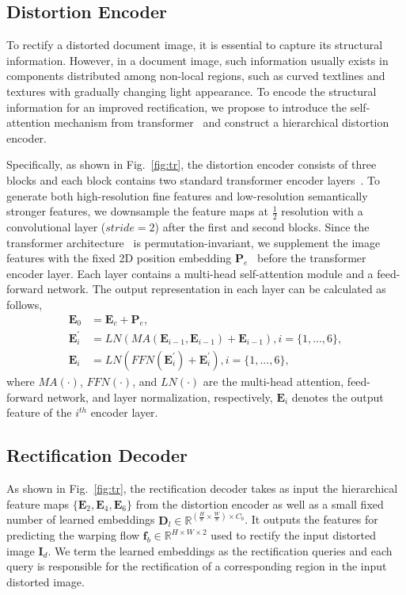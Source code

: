 \documentclass[lettersize,journal]{IEEEtran}
\begin{document}
\subsection{Distortion Encoder}
To rectify a distorted document image, it is essential to capture its structural information.
However, in a document image, such information usually exists in components distributed among non-local regions, such as curved textlines and textures with gradually changing light appearance.
To encode the structural information for an improved rectification,
we propose to introduce the self-attention mechanism from transformer~\cite{Vaswani2017AttentionIA} and construct a hierarchical distortion encoder.

Specifically, 
as shown in Fig.~\ref{fig:tr},
the distortion encoder consists of three blocks and each block contains two standard transformer encoder layers~\cite{Vaswani2017AttentionIA}.
To generate both high-resolution fine features and low-resolution semantically stronger features,
we downsample the feature maps at $\frac{1}{2}$ resolution with a convolutional layer ($stride=2$) after the first and second blocks.
Since the transformer architecture~\cite{Vaswani2017AttentionIA} is permutation-invariant,
we supplement the image features with the fixed 2D position embedding $\bm{P}_e$~\cite{bello2019attention} before the transformer encoder layer.
Each layer contains a multi-head self-attention module and a feed-forward network.
The output representation in each layer can be calculated as follows,
\begin{equation}
\begin{aligned}
    \bm{E}_0 &= \bm{E}_{c}+\bm{P}_{e}, \\
\bm{E}^{'}_i &= LN(MA(\bm{E}_{i-1}, \bm{E}_{i-1}) + \bm{E}_{i-1}), i=\{1,...,6\}, \\
    \bm{E}_i &= LN(FFN(\bm{E}^{'}_i) + \bm{E}^{'}_i), i=\{1,...,6\},
\end{aligned}
\label{equ:transenc}
\end{equation}
where $MA(\cdot)$, $FFN(\cdot)$, and $LN(\cdot)$ are the multi-head attention, feed-forward network, and layer normalization, respectively,
$\bm{E}_i$ denotes the output feature of the $i^{th}$ encoder layer.

\subsection{Rectification Decoder}
As shown in Fig.~\ref{fig:tr}, the rectification decoder takes as input the hierarchical feature maps $\{\bm{E}_2, \bm{E}_4, \bm{E}_6\}$ from the distortion encoder as well as a
small fixed number of learned embeddings $\bm{D}_l \in \mathbb{R}^{(\frac{H}{8}\times\frac{W}{8})\times C_{b}}$.
It outputs the features for predicting the warping flow $\bm{f}_b \in \mathbb{R}^{H\times W\times 2}$ used to rectify the input distorted image $\bm{I}_d$.
We term the learned embeddings as the rectification queries and each query is responsible for the rectification of a corresponding region in the input distorted image.
\end{document}
